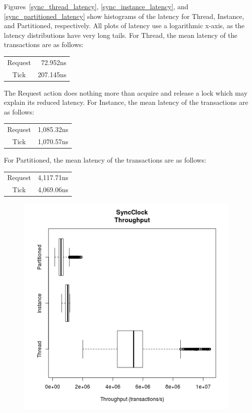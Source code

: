 Figures~\ref{sync_thread_latency}, \ref{sync_instance_latency}, and \ref{sync_partitioned_latency} show histograms of the latency for Thread, Instance, and Partitioned, respectively.
All plots of latency use a logarithmic x-axis, as the latency distributions have very long tails.
For Thread, the mean latency of the transactions are as follows:
\begin{center}
\begin{tabular}{cr}
Request &  72.952ns \\
Tick    & 207.145ns \\
\end{tabular}
\end{center}
The Request action does nothing more than acquire and release a lock which may explain its reduced latency.
For Instance, the mean latency of the transactions are as follows:
\begin{center}
\begin{tabular}{cr}
Request & 1,085.32ns \\
Tick    & 1,070.57ns \\
\end{tabular}
\end{center}
For Partitioned, the mean latency of the transactions are as follows:
\begin{center}
\begin{tabular}{cr}
Request & 4,117.71ns \\
Tick    & 4,069.06ns \\
\end{tabular}
\end{center}

\begin{figure}
\center
\includegraphics[height=.4\textheight]{sync_throughput_box.png}
\caption{\label{sync_throughput_box}}
\end{figure}

